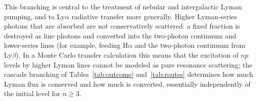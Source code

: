 \documentclass[english,a4paper]{my_memo}
\begin{document}
This branching is central to the treatment of nebular and intergalactic
Lyman pumping, and to Ly$\alpha$ radiative transfer more generally.  Higher
Lyman-series photons that are absorbed are not conservatively scattered:
a fixed fraction is destroyed as line photons and converted into the
two-photon continuum and lower-series lines (for example, feeding H$\alpha$
and the two-photon continuum from Ly$\beta$).  In a Monte Carlo transfer
calculation this means that the excitation of $np$ levels by higher Lyman
lines cannot be modeled as pure resonance scattering; the cascade branching
of Tables~\ref{tab:outcome} and~\ref{tab:routes} determines how much Lyman
flux is conserved and how much is converted, essentially independently of the
initial level for $n \ge 3$.
\end{document}
